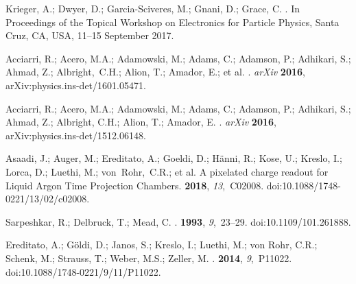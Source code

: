\documentclass[instruments,article,accept,moreauthors,pdftex]{Definitions/mdpi}
\begin{document}
\begin{thebibliography}{999}
Krieger, A.; Dwyer, D.; Garcia-Sciveres, M.; Gnani, D.; Grace, C.
.
\newblock  In Proceedings of the Topical Workshop on Electronics for Particle Physics,  {Santa Cruz, CA, USA, 11--15 September 2017}.

Acciarri, R.; Acero, M.A.; Adamowski, M.; Adams, C.; Adamson, P.; Adhikari, S.; Ahmad, Z.; Albright,~C.H.; Alion, T.; Amador, E.; et al.
. \emph{arXiv} {\bf 2016}, arXiv:physics.ins-det/1601.05471.

Acciarri, R.; Acero, M.A.; Adamowski, M.; Adams, C.; Adamson, P.; Adhikari, S.; Ahmad, Z.; Albright, C.H.; Alion, T.; Amador, E.
. \emph{arXiv} {\bf 2016}, arXiv:physics.ins-det/1512.06148.

Asaadi, J.; Auger, M.; Ereditato, A.; Goeldi, D.; Hänni, R.; Kose, U.; Kreslo,
  I.; Lorca, D.; Luethi, M.; \mbox{von Rohr, C.R.}; et al.
\newblock A pixelated charge readout for Liquid Argon Time Projection Chambers.
 {\bf 2018}, {\em
  13},~C02008.
\newblock
  doi:10.1088/1748-0221/13/02/c02008.

Sarpeshkar, R.; Delbruck, T.; Mead, C.
.
 {\bf 1993}, {\em 9},~23--29.
\newblock
  doi:10.1109/101.261888.

Ereditato, A.; Göldi, D.; Janos, S.; Kreslo, I.; Luethi, M.; von Rohr, C.R.; Schenk, M.; Strauss, T.; Weber, M.S.; Zeller, M.
.
 {\bf 2014}, {\em 9},~P11022.
\newblock
  doi:10.1088/1748-0221/9/11/P11022.


\end{thebibliography}
\end{document}
